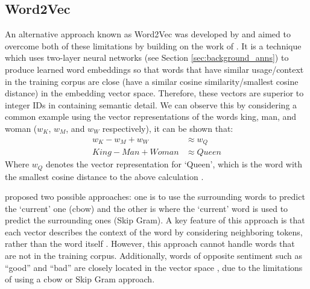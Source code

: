 \subsection{Word2Vec}\label{sec:embeddings_word2vec}
An alternative approach known as Word2Vec was developed by \citet{mikolov2013efficient} and aimed to overcome both of these limitations by building on the work of \citet{bengio2000neural}. It is a technique which uses two-layer neural networks (see Section \ref{sec:background_anns}) to produce learned word embeddings so that words that have similar usage/context in the training corpus are close (have a similar cosine similarity/smallest cosine distance) in the embedding vector space. Therefore, these vectors are superior to integer IDs in containing semantic detail. We can observe this by considering a common example using the vector representations of the words king, man, and woman ($w_K$, $w_M$, and $w_W$ respectively), it can be shown that:
\begin{equation*}
    \begin{aligned}
        w_K - w_M + w_W &\approx w_Q \\
        King - Man + Woman &\approx Queen
    \end{aligned}
\end{equation*}
Where $w_Q$ denotes the vector representation for `Queen', which is the word with the smallest cosine distance to the above calculation \citep{allen2019analogies}.

\cite{mikolov2013efficient} proposed two possible approaches: one is to use the surrounding words to predict the `current' one (\acrfull{cbow}) and the other is where the `current' word is used to predict the surrounding ones (Skip Gram). A key feature of this approach is that each vector describes the context of the word by considering neighboring tokens, rather than the word itself \citep{li2018introduction}. However, this approach cannot handle words that are not in the training corpus. Additionally, words of opposite sentiment such as ``good” and ``bad” are closely located in the vector space \citep{sivakumar2020review}, due to the limitations of using a \acrshort{cbow} or Skip Gram approach.


